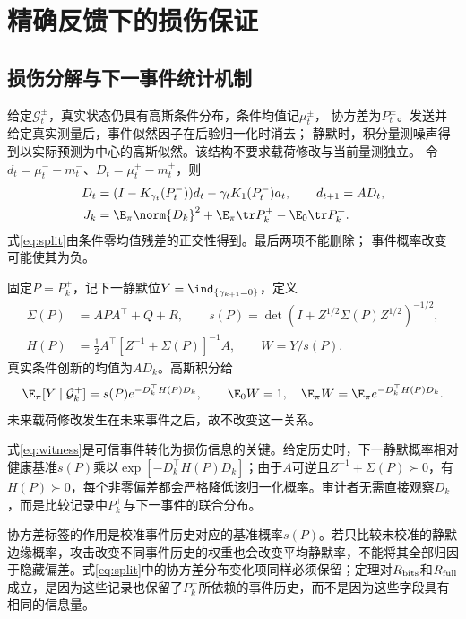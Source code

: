 \section{精确反馈下的损伤保证}
\label{sec:exact}
\subsection{损伤分解与下一事件统计机制}
给定$\mathcal G_t^\pm$，真实状态仍具有高斯条件分布，条件均值记$\mu_t^\pm$，
协方差为$P_t^\pm$。发送并给定真实测量后，事件似然因子在后验归一化时消去；
静默时，积分量测噪声得到以实际预测为中心的高斯似然。该结构不要求载荷修改与当前量测独立。
令$d_t=\mu_t^--m_t^-$、$D_t=\mu_t^+-m_t^+$，则
\begin{align}
D_t&=(I-K_{\gamma_t}(P_t^-))d_t-\gamma_tK_1(P_t^-)a_t,\qquad
d_{t+1}=AD_t,\label{eq:bias}\\
J_k&=\E_\pi\norm{D_k}^2+
\E_\pi\tr P_k^+-\E_0\tr P_k^+.\label{eq:split}
\end{align}
式\eqref{eq:split}由条件零均值残差的正交性得到。最后两项不能删除；
事件概率改变可能使其为负。

固定$P=P_k^+$，记下一静默位$Y=\ind_{\{\gamma_{k+1}=0\}}$，定义
\begin{align}
\Sigma(P)&=APA^\top+Q+R,\qquad
s(P)=\det(I+Z^{1/2}\Sigma(P)Z^{1/2})^{-1/2},\nonumber\\
H(P)&=\tfrac12 A^\top[Z^{-1}+\Sigma(P)]^{-1}A,\qquad
W=Y/s(P).
\end{align}
真实条件创新的均值为$AD_k$。高斯积分给
\begin{equation}
\E_\pi[Y\mid\mathcal G_k^+]=s(P)e^{-D_k^\top H(P)D_k},
\qquad \E_0W=1,\quad \E_\pi W=\E_\pi e^{-D_k^\top H(P)D_k}.
\label{eq:witness}
\end{equation}
未来载荷修改发生在未来事件之后，故不改变这一关系。

式\eqref{eq:witness}是可信事件转化为损伤信息的关键。给定历史时，下一静默概率相对健康基准$s(P)$乘以$\exp[-D_k^\top H(P)D_k]$；由于$A$可逆且$Z^{-1}+\Sigma(P)\succ0$，有$H(P)\succ0$，每个非零偏差都会严格降低该归一化概率。审计者无需直接观察$D_k$，而是比较记录中$P_k^+$与下一事件的联合分布。

协方差标签的作用是校准事件历史对应的基准概率$s(P)$。若只比较未校准的静默边缘概率，攻击改变不同事件历史的权重也会改变平均静默率，不能将其全部归因于隐藏偏差。式\eqref{eq:split}中的协方差分布变化项同样必须保留；定理对$R_{\rm bits}$和$R_{\rm full}$成立，是因为这些记录也保留了$P_k^+$所依赖的事件历史，而不是因为这些字段具有相同的信息量。

